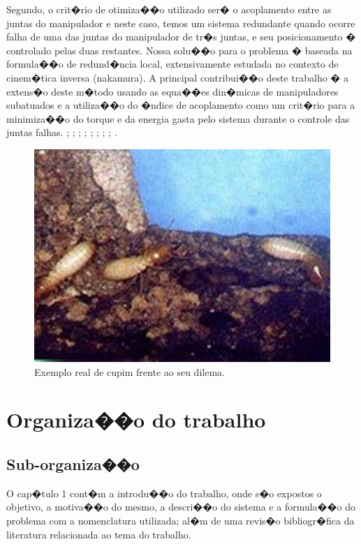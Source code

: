 Segundo, o crit�rio de otimiza��o utilizado ser� o acoplamento entre as juntas do
manipulador e neste caso, temos um sistema redundante quando ocorre falha de uma das juntas do manipulador de tr�s juntas, e seu posicionamento � controlado pelas duas restantes. Nossa solu��o para o problema � baseada na formula��o
de redund�ncia local, extensivamente estudada no contexto de cinem�tica inversa ({nakamura}). A principal contribui��o deste trabalho � a extens�o deste m�todo usando as equa��es din�micas de manipuladores subatuados e a utiliza��o do �ndice de acoplamento como um crit�rio para a minimiza��o do torque e da energia gasta pelo sistema durante o controle das juntas falhas. \cite{dosdesmonte}; \cite{freire2012ensino}; \cite{barsottiuso}; \cite{de2012simulaccoes}; \cite{grabowski2006ensino}; \cite{ramos2008concepccao}; \cite{de2010simuladores}; \cite{santosuso}; \cite{mendes2009uso}.

	
\begin{figure}[ht!]
\centering
\includegraphics[width=1\textwidth]{Cap1/cupimconcreto}
\caption{Exemplo real de cupim frente ao seu dilema.}
\label{FDII}
\end{figure}

\section{Organiza��o do trabalho}
\subsection{Sub-organiza��o}
O cap�tulo 1 cont�m a introdu��o do trabalho, onde s�o expostos o objetivo, a motiva��o do mesmo, a descri��o do sistema e a formula��o do problema com a nomenclatura utilizada; al�m de uma revis�o bibliogr�fica da literatura relacionada ao tema do trabalho.

